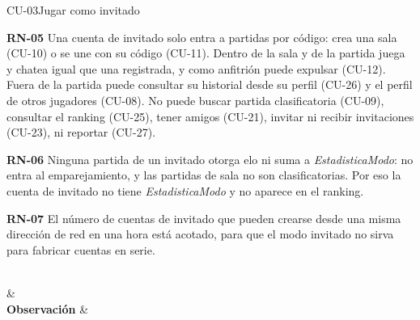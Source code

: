 \begin{fichacu}{CU-03}{Jugar como invitado}
{\begin{cureglas}
      \item \textbf{\mbox{RN-05}} Una cuenta de invitado solo entra a partidas por código: crea una sala (\mbox{CU-10}) o se une con su código (\mbox{CU-11}). Dentro de la sala y de la partida juega y chatea igual que una registrada, y como anfitrión puede expulsar (\mbox{CU-12}). Fuera de la partida puede consultar su historial desde su perfil (\mbox{CU-26}) y el perfil de otros jugadores (\mbox{CU-08}). No puede buscar partida clasificatoria (\mbox{CU-09}), consultar el ranking (\mbox{CU-25}), tener amigos (\mbox{CU-21}), invitar ni recibir invitaciones (\mbox{CU-23}), ni reportar (\mbox{CU-27}).
      \item \textbf{\mbox{RN-06}} Ninguna partida de un invitado otorga elo ni suma a \textit{EstadisticaModo}: no entra al emparejamiento, y las partidas de sala no son clasificatorias. Por eso la cuenta de invitado no tiene \textit{EstadisticaModo} y no aparece en el ranking.
      \item \textbf{\mbox{RN-07}} El número de cuentas de invitado que pueden crearse desde una misma dirección de red en una hora está acotado, para que el modo invitado no sirva para fabricar cuentas en serie.
    \end{cureglas}} \\
   &  \\ \hline
  \textbf{Observación} & 
\end{fichacu}
